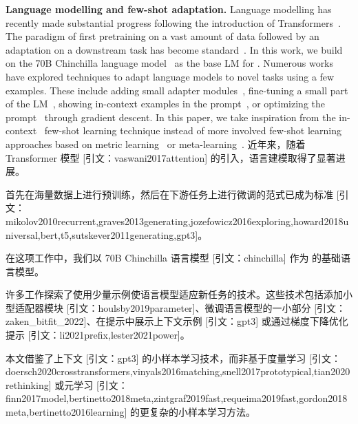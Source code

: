 \textbf{Language modelling and few-shot adaptation.}
Language modelling has recently made substantial progress following the introduction of Transformers~\citep{vaswani2017attention}.
The paradigm of first pretraining on a vast amount of data followed by an adaptation on a downstream task has become standard~\citep{mikolov2010recurrent,graves2013generating,jozefowicz2016exploring,howard2018universal,bert,t5,sutskever2011generating,gpt3}.
In this work, we build on the 70B Chinchilla language model~\citep{chinchilla} as the base LM for \largem{}.
Numerous works have explored techniques to adapt language models to novel tasks using a few examples.
These include adding small adapter modules~\citep{houlsby2019parameter}, fine-tuning a small part of the LM~\citep{zaken_bitfit_2022}, showing in-context examples in the prompt~\citep{gpt3}, or optimizing the prompt~\citep{li2021prefix,lester2021power} through gradient descent.
In this paper, we take inspiration from the in-context~\citep{gpt3} few-shot learning technique instead of more involved few-shot learning approaches based on metric learning~\citep{doersch2020crosstransformers,vinyals2016matching,snell2017prototypical,tian2020rethinking} or meta-learning~\citep{finn2017model,bertinetto2018meta,zintgraf2019fast,requeima2019fast,gordon2018meta,bertinetto2016learning}.
近年来，随着 Transformer 模型 [引文：vaswani2017attention] 的引入，语言建模取得了显著进展。

首先在海量数据上进行预训练，然后在下游任务上进行微调的范式已成为标准 [引文：mikolov2010recurrent,graves2013generating,jozefowicz2016exploring,howard2018universal,bert,t5,sutskever2011generating,gpt3]。

在这项工作中，我们以 70B Chinchilla 语言模型 [引文：chinchilla] 作为 \largem{} 的基础语言模型。

许多工作探索了使用少量示例使语言模型适应新任务的技术。这些技术包括添加小型适配器模块 [引文：houlsby2019parameter]、微调语言模型的一小部分 [引文：zaken_bitfit_2022]、在提示中展示上下文示例 [引文：gpt3] 或通过梯度下降优化提示 [引文：li2021prefix,lester2021power]。

本文借鉴了上下文 [引文：gpt3] 的小样本学习技术，而非基于度量学习 [引文：doersch2020crosstransformers,vinyals2016matching,snell2017prototypical,tian2020rethinking] 或元学习 [引文：finn2017model,bertinetto2018meta,zintgraf2019fast,requeima2019fast,gordon2018meta,bertinetto2016learning] 的更复杂的小样本学习方法。


